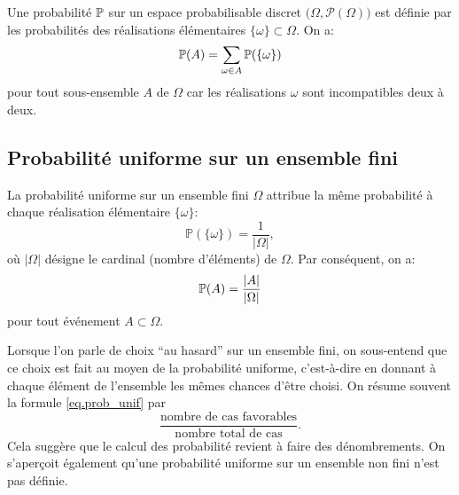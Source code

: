 Une probabilité $\P$ sur un espace probabilisable discret $\big( \Omega,\mathcal{P} (\Omega) \big)$ est définie par les probabilités des réalisations élémentaires $\{\omega\} \subset \Omega$. On a:
$$ \mathbb{P} (A) = \sum_{\omega \in A} \P (\{\omega\}) $$
pour tout sous-ensemble $A$ de $\Omega$ car les réalisations $\omega$ sont incompatibles deux à deux.

\subsection{Probabilité uniforme sur un ensemble fini}

La probabilité uniforme sur un ensemble fini $\Omega$ attribue la même probabilité à chaque réalisation élémentaire $\{\omega\}$:
\[ \mathbb{P} (\{\omega\}) = \frac{1}{|\Omega|},\]
où $|\Omega|$ désigne le cardinal (nombre d'éléments) de $\Omega$. Par conséquent, on a:
\begin{equation}
	\mathbb{P} (A) = \frac{|A|}{|\Omega|}
	\label{eq.prob_unif}
	\redspace
\end{equation}
pour tout événement $A \subset \Omega$.

\begin{remark}
	Lorsque l'on parle de choix ``au hasard'' sur un ensemble fini, on sous-entend que ce choix est fait au moyen de la probabilité uniforme, c'est-à-dire en donnant à chaque élément de l'ensemble les mêmes chances d'être choisi. On résume souvent la formule \eqref{eq.prob_unif} par  \[\frac{\text{nombre de cas favorables}}{\text{nombre total de cas}}.\] Cela suggère que le calcul des probabilité revient à faire des dénombrements.  On s'aperçoit également qu'une probabilité uniforme sur un ensemble non fini n'est pas définie.
\end{remark}
\sld{\vfill\pagebreak[5]}%



